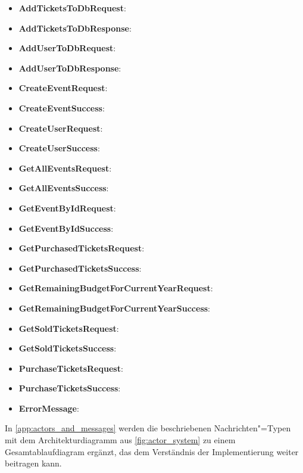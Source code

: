 \begin{itemize}[itemsep=-.5em,leftmargin=*]
    \item \textbf{AddTicketsToDbRequest}:
    \item \textbf{AddTicketsToDbResponse}:
    \item \textbf{AddUserToDbRequest}:
    \item \textbf{AddUserToDbResponse}:
    \item \textbf{CreateEventRequest}:
    \item \textbf{CreateEventSuccess}:
    \item \textbf{CreateUserRequest}:
    \item \textbf{CreateUserSuccess}:
    \item \textbf{GetAllEventsRequest}:
    \item \textbf{GetAllEventsSuccess}:
    \item \textbf{GetEventByIdRequest}:
    \item \textbf{GetEventByIdSuccess}:
    \item \textbf{GetPurchasedTicketsRequest}:
    \item \textbf{GetPurchasedTicketsSuccess}:
    \item \textbf{GetRemainingBudgetForCurrentYearRequest}:
    \item \textbf{GetRemainingBudgetForCurrentYearSuccess}:
    \item \textbf{GetSoldTicketsRequest}:
    \item \textbf{GetSoldTicketsSuccess}:
    \item \textbf{PurchaseTicketsRequest}:
    \item \textbf{PurchaseTicketsSuccess}:
    \item \textbf{ErrorMessage}:
\end{itemize}

In \autoref{app:actors_and_messages} werden die beschriebenen Nachrichten"=Typen mit dem Architekturdiagramm aus \autoref{fig:actor_system} zu einem Gesamtablaufdiagram ergänzt, das dem Verständnis der Implementierung weiter beitragen kann.
